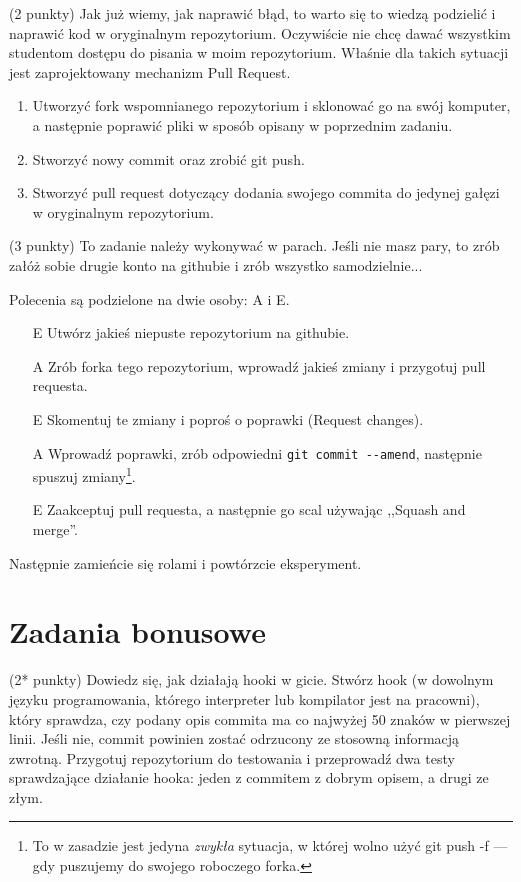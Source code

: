 \begin{zadanie}(2 punkty)
Jak już wiemy, jak naprawić błąd, to warto się to wiedzą podzielić i naprawić kod w oryginalnym repozytorium.  Oczywiście nie chcę dawać wszystkim studentom dostępu do pisania w moim repozytorium. Właśnie dla takich sytuacji jest zaprojektowany mechanizm Pull Request.

\begin{enumerate}
\item Utworzyć fork wspomnianego repozytorium i sklonować go na swój komputer, a następnie poprawić pliki w sposób opisany w poprzednim zadaniu.
\item  Stworzyć nowy commit oraz zrobić git push.
\item  Stworzyć pull request dotyczący dodania swojego commita do jedynej gałęzi w oryginalnym repozytorium.
\end{enumerate}
\end{zadanie}

\begin{zadanie} (3 punkty)
To zadanie należy wykonywać w parach. Jeśli nie masz pary, to zrób załóż sobie drugie konto na githubie i zrób wszystko samodzielnie...

Polecenia są podzielone na dwie osoby: A i E.
\begin{itemize}
\item[E] Utwórz jakieś niepuste repozytorium na githubie.
\item[A] Zrób forka tego repozytorium, wprowadź jakieś zmiany i przygotuj pull requesta.
\item[E] Skomentuj te zmiany i poproś o poprawki (Request changes).
\item[A] Wprowadź poprawki, zrób odpowiedni \verb+git commit --amend+, następnie spuszuj zmiany\footnote{To w zasadzie jest jedyna \emph{zwykła} sytuacja, w której wolno użyć git push -f --- gdy puszujemy do swojego roboczego forka. }.
\item[E] Zaakceptuj pull requesta, a następnie go scal używając ,,Squash  and merge''.
\end{itemize}

Następnie zamieńcie się rolami i powtórzcie eksperyment.
\end{zadanie}
\section*{Zadania bonusowe}

\begin{zadanie}(2* punkty)
Dowiedz się, jak działają hooki w gicie.
Stwórz hook (w dowolnym języku programowania, którego interpreter lub kompilator jest na pracowni), który sprawdza, czy podany opis commita ma co najwyżej 50 znaków w pierwszej linii. Jeśli nie, commit powinien zostać odrzucony ze stosowną informacją zwrotną. Przygotuj repozytorium do testowania i przeprowadź dwa testy sprawdzające działanie hooka: jeden z commitem z dobrym opisem, a drugi ze złym. 
\end{zadanie}

